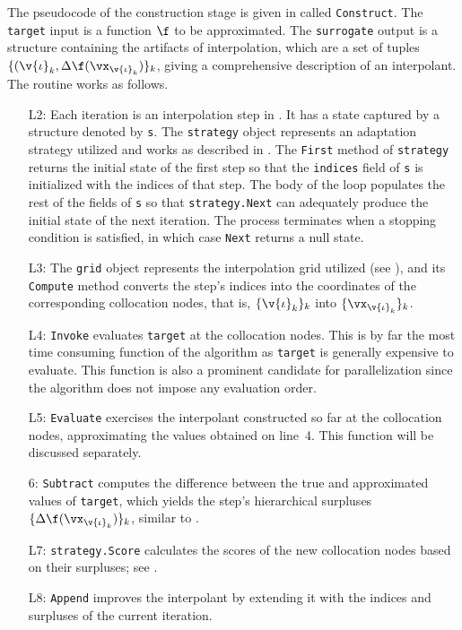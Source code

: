 The pseudocode of the construction stage is given in  called
\texttt{Construct}. The \texttt{target} input is a function $\f$ to be
approximated. The \texttt{surrogate} output is a structure containing the
artifacts of interpolation, which are a set of tuples $\{ (\v{\iota}_k,
\Delta\f(\vx_{\v{\iota}_k}) \}_k$, giving a comprehensive description of an
interpolant. The routine works as follows.

\begin{itemize}

\item[L2:] Each iteration is an interpolation step in . It
has a state captured by a structure denoted by \texttt{s}. The \texttt{strategy}
object represents an adaptation strategy utilized and works as described in
. The \texttt{First} method of \texttt{strategy} returns the
initial state of the first step so that the \texttt{indices} field of \texttt{s}
is initialized with the indices of that step. The body of the loop populates the
rest of the fields of \texttt{s} so that \texttt{strategy.Next} can adequately
produce the initial state of the next iteration. The process terminates when a
stopping condition is satisfied, in which case \texttt{Next} returns a null
state.

\item[L3:] The \texttt{grid} object represents the interpolation grid utilized
(see ), and its \texttt{Compute} method converts the step's indices
into the coordinates of the corresponding collocation nodes, that is, $\{
\v{\iota}_k \}_k$ into $\{ \vx_{\v{\iota}_k} \}_k$.

\item[L4:] \texttt{Invoke} evaluates \texttt{target} at the collocation nodes.
This is by far the most time consuming function of the algorithm as
\texttt{target} is generally expensive to evaluate. This function is also a
prominent candidate for parallelization since the algorithm does not impose any
evaluation order.

\item[L5:] \texttt{Evaluate} exercises the interpolant constructed so far at the
collocation nodes, approximating the values obtained on line~4. This function
will be discussed separately.

\item[6:] \texttt{Subtract} computes the difference between the true and
approximated values of \texttt{target}, which yields the step's hierarchical
surpluses $\{ \Delta\f(\vx_{\v{\iota}_k}) \}_k$, similar to .

\item[L7:] \texttt{strategy.Score} calculates the scores of the new collocation
nodes based on their surpluses; see .

\item[L8:] \texttt{Append} improves the interpolant by extending it with the
indices and surpluses of the current iteration.

\end{itemize}

